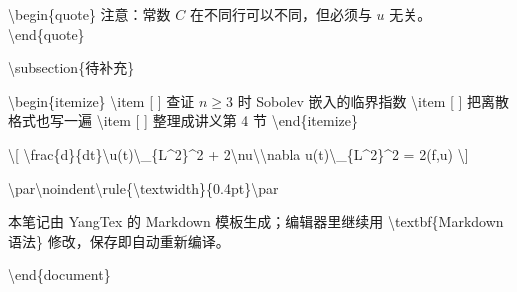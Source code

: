 \documentclass[UTF8,a4paper,11pt,fontset=fandol]{ctexart}
\begin{document}
\textbackslash{}begin\{quote\} 注意：常数 $C$ 在不同行可以不同，但必须与 $u$ 无关。 \textbackslash{}end\{quote\}

\textbackslash{}subsection\{待补充\}

\textbackslash{}begin\{itemize\} \textbackslash{}item [ ] 查证 $n \ge 3$ 时 Sobolev 嵌入的临界指数 \textbackslash{}item [ ] 把离散格式也写一遍 \textbackslash{}item [ ] 整理成讲义第 4 节 \textbackslash{}end\{itemize\}

\textbackslash{}[ \textbackslash{}frac\{d\}\{dt\}\textbackslash{}\textbar{}u(t)\textbackslash{}\textbar{}\_\{L\textasciicircum{}2\}\textasciicircum{}2 + 2\textbackslash{}nu\textbackslash{}\textbar{}\textbackslash{}nabla u(t)\textbackslash{}\textbar{}\_\{L\textasciicircum{}2\}\textasciicircum{}2 = 2(f,u) \textbackslash{}]

\textbackslash{}par\textbackslash{}noindent\textbackslash{}rule\{\textbackslash{}textwidth\}\{0.4pt\}\textbackslash{}par

本笔记由 YangTex 的 Markdown 模板生成；编辑器里继续用 \textbackslash{}textbf\{Markdown 语法\} 修改，保存即自动重新编译。

\textbackslash{}end\{document\}
\end{document}
